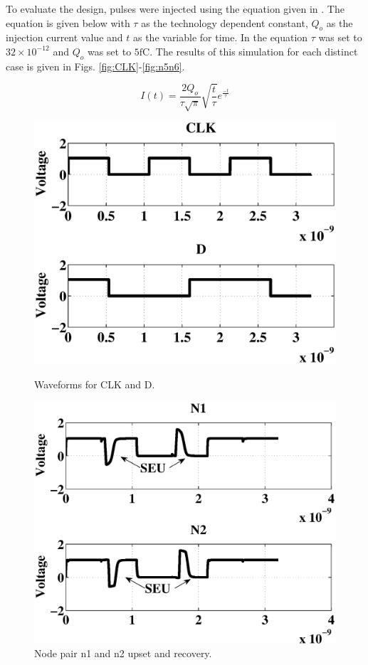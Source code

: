 To evaluate the design, pulses were injected using the equation given in \cite{injeq}. The equation is given below with $\tau$ as the technology dependent constant, $Q_o$ as the injection current value and $t$ as the variable for time. In the equation $\tau$ was set to $32\times10^{-12}$ and $Q_o$ was set to $5\text{fC}$. The results of this simulation for each distinct case is given in Figs. \ref{fig:CLK}-\ref{fig:n5n6}. 

\begin{equation}\label{qeq}
	I(t)=\frac{2Q_o}{\tau\sqrt{\pi}}\sqrt{\frac{t}{\tau}}e^{\frac{-t}{\tau}}
\end{equation}

\begin{figure}[!htbp]
	\centering
	\parbox{4cm}{
		\includegraphics[width=1.15\linewidth]{Figures/WavePlots/CLKD.eps}
		\caption{Waveforms for CLK and D.}
		\label{fig:CLK}}
	\qquad
	\begin{minipage}{4cm}
		\includegraphics[width=\linewidth]{Figures/WavePlots/n1n2.eps}
		\caption{Node pair n1 and n2 upset and recovery.}
		\label{fig:n1n2}
	\end{minipage}
\end{figure}

